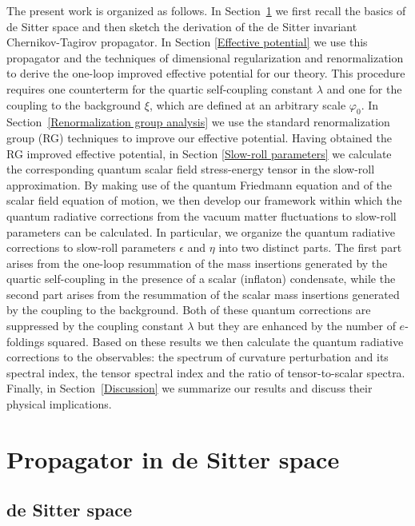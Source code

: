 \documentclass[aps,12pt,superscriptaddress,preprintnumbers,
                secnumarabic,nofootinbib,showpacs]{revtex4}
\begin{document}
The present work is organized as follows. In
Section~\ref{Propagator in de Sitter space} we first recall the
basics of de Sitter space and then sketch the derivation of the de
Sitter invariant Chernikov-Tagirov propagator. In Section
\ref{Effective potential} we use this propagator and the
techniques of dimensional regularization and renormalization to
derive the one-loop improved effective potential for our theory.
This procedure requires one counterterm for the quartic
self-coupling constant $\lambda$ and one for the coupling to the
background $\xi$, which are defined at an arbitrary scale
$\varphi_0$. In Section~\ref{Renormalization group analysis} we
use the standard renormalization group (RG) techniques to improve
our effective potential. 
Having obtained the RG improved effective
potential, in Section \ref{Slow-roll parameters} we calculate the
corresponding quantum scalar field stress-energy tensor in the slow-roll
approximation. By making use of the quantum Friedmann equation and
of the scalar field equation of motion, we then develop our
framework within which the quantum radiative corrections from the
vacuum matter fluctuations to slow-roll parameters can be
calculated. In particular, we organize the quantum radiative
corrections to slow-roll parameters $\epsilon$ and $\eta$ into two
distinct parts. The first part arises from the one-loop
resummation of the mass insertions generated by the quartic
self-coupling in the presence of a scalar (inflaton) condensate,
while the second part arises from the resummation of the scalar mass
insertions generated by the coupling to the background. Both of
these quantum corrections are suppressed by the coupling constant
$\lambda$ but they are enhanced by the number of $e$-foldings squared.
Based on these results we then calculate the quantum radiative
corrections to the observables: the spectrum of curvature
perturbation and its spectral index, the tensor spectral index and
the ratio of tensor-to-scalar spectra. Finally, in
Section~\ref{Discussion} we summarize our results and discuss
their physical implications.

\section{Propagator in de Sitter space}
\label{Propagator in de Sitter space}

\subsection{de Sitter space}
\label{de Sitter space}
\end{document}
